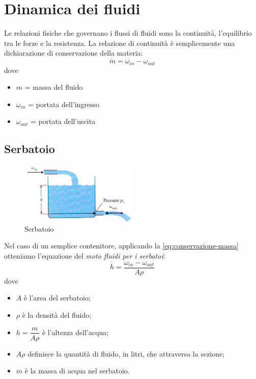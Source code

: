 \documentclass[a4paper]{report}
\begin{document}
\section{Dinamica dei fluidi}
Le relazioni fisiche che governano i flussi di fluidi sono la
continuit\`a, l'equilibrio tra le forze e la resistenza. La relazione
di continuit\`a \`e semplicemente una dichiarazione di conservazione
della materia:
\begin{equation}\label{eq:conservazione-massa}
  \dot{m} = \omega_{in} - \omega_{out}
\end{equation}
dove
\begin{itemize}
\item $m$ = massa del fluido
\item $\omega_{in}$ = portata dell'ingresso
\item $\omega_{out}$ = portata dell'uscita
\end{itemize}

\subsection{Serbatoio}
\begin{figure}[!h]
\centering
\includegraphics[width=0.5\textwidth]{./images/serbatoio.png}
\caption{Serbatoio\label{fig:serbatoio}}
\end{figure}
Nel caso di un semplice contenitore, applicando la
\ref{eq:conservazione-massa} otteniamo l'equazione del {\em moto
  fluidi per i serbatoi}:
\begin{equation}\label{eq:fluidi-serbatoio}
  \dot{h} = \frac{\omega_{in} - \omega_{out}}{A \rho}
\end{equation}
dove
\begin{itemize}
\item $A$ \`e l'area del serbatoio;
\item $\rho$ \`e la densit\`a del fluido;
\item $h = \dfrac{m}{A \rho}$ \`e l'altezza dell'acqua;
\item $A \rho$ definisce la quantit\`a di fluido, in litri, che
  attraversa la sezione;
\item $m$ \`e la massa di acqua nel serbatoio.
\end{itemize}
\end{document}
